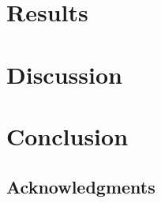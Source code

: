 \documentclass[twocolumn]{\docclass}
\begin{document}

\section{Results}
\label{sec:results}




\section{Discussion}
\label{sec:discussion}




\section{Conclusion}
\label{sec:conclusion}




\subsection*{Acknowledgments}











\end{document}
